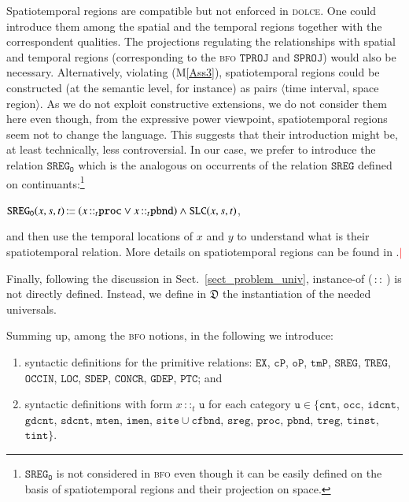 \documentclass[ao]{iosart2x}
\newcommand{\nb}[1]{\textcolor{red}{$|$}\marginpar{\hspace*{-0cm}\parbox{20mm}{\scriptsize\raggedright\textcolor{red}{#1}}}}
\newcommand{\bflist}{\begin{list}{}{\setlength{\topsep}{2mm}\setlength{\parsep}{0mm}\setlength{\leftmargin}{9.2mm}\setlength{\labelwidth}{8mm}}}
\newcommand{\eflist}{\end{list}}
\newcommand{\pr}[1]{\mathtt{#1}}
\newcommand{\cn}[1]{\mathtt{#1}}
\newcommand\textequal{%
 \rule[.08ex]{5pt}{0.35pt}\llap{\rule[.78ex]{5pt}{0.35pt}}}
\newcommand{\sdef}{{\hspace{1.5pt}:\hspace{-2.5pt}\textequal\hspace{3pt}}}
\newcommand{\dolce}{{\textsc{dolce}}}
\newcommand{\bfo}{{\textsc{bfo}}}
\newcommand {\thdolce} {\ensuremath{\mathfrak{D}}}
\newcommand {\SLCd} {\ensuremath{\pr{SLC}}}
\newcommand {\TLCd} {\ensuremath{\pr{TLC}}}
\newcommand{\cntbcat}{\cn{cnt}}
\newcommand{\idcntbcat}{\cn{idcnt}}
\newcommand{\gdcntbcat}{\cn{gdcnt}}
\newcommand{\sdcntbcat}{\cn{sdcnt}}
\newcommand{\mtenbcat}{\cn{mten}}
\newcommand{\imenbcat}{\cn{imen}}
\newcommand{\sitebcat}{\cn{site}}
\newcommand{\cfbndbcat}{\cn{cfbnd}}
\newcommand{\sregbcat}{\cn{sreg}}
\newcommand{\occbcat}{\cn{occ}}
\newcommand{\procbcat}{\cn{proc}}
\newcommand{\pbndbcat}{\cn{pbnd}}
\newcommand{\tregbcat}{\cn{treg}}
\newcommand{\tinstbcat}{\cn{tinst}}
\newcommand{\tintbcat}{\cn{tint}}
\newcommand{\bfocpart}{\pr{cP}}
\newcommand{\bfoopart}{\pr{oP}}
\newcommand{\bfotpart}{\pr{tmP}}
\newcommand{\bfoexist}{\pr{EX}}
\newcommand{\bfoiof}[1]{{\,::_{#1\:\!}}}
\newcommand{\bfosdep}{\pr{SDEP}}
\newcommand{\bfogdep}{\pr{GDEP}}
\newcommand{\bfooccurs}{\pr{OCCIN}}
\newcommand{\bfolocated}{\pr{LOC}}
\newcommand{\bfosregof}{\pr{SREG}}
\newcommand{\bfosregofocc}{\pr{SREG_O}}
\newcommand{\bfotregof}{\pr{TREG}}
\newcommand{\bfoparticin}{\pr{PTC}}
\newcommand{\bfoconcr}{\pr{CONCR}}
\newcommand{\bfotproj}{\pr{TPROJ}}
\newcommand{\bfosproj}{\pr{SPROJ}}
\begin{document}
\medskip
Spatiotemporal regions are compatible but not enforced in {\dolce}. One could introduce them among the spatial and the temporal regions together with the correspondent qualities. The projections regulating the relationships with spatial and temporal regions (corresponding to the {\bfo} $\bfotproj$ and $\bfosproj$) would also be necessary.
Alternatively, violating (M\ref{Ass3}), spatiotemporal regions could be constructed (at the semantic level, for instance) as pairs $\langle$time interval, space region$\rangle$. 
%
As we do not exploit constructive extensions, %
we do not consider them here even though, from the expressive power viewpoint, spatiotemporal regions seem not to change the language. This suggests that their introduction might be, at least technically, less controversial. %
In our case, we prefer to introduce the relation $\bfosregofocc$ which is the analogous on occurrents of the relation $\bfosregof$ defined on continuants:\footnote{$\bfosregofocc$ is not considered in {\bfo} even though it can be easily defined on the basis of spatiotemporal regions and their projection on space.}
%
\bflist
\item[] $\bfosregofocc(x,s,t) \sdef (x \bfoiof{t} \procbcat \lor x \bfoiof{t} \pbndbcat) \land \SLCd(x,s,t)$,
\eflist
%
and then use the temporal locations of $x$ and $y$ to understand what is their spatiotemporal relation. More details on spatiotemporal regions can be found in \cite{OntoCdel2.4}.\nb{CM: rif. deliverable}

Finally, following the discussion in Sect.~\ref{sect_problem_univ}, instance-of ($\bfoiof{}$) is not directly defined. Instead, we define in $\thdolce$ the instantiation of the needed universals.

Summing up, among the {\bfo} notions, in the following we introduce: 
\begin{enumerate}[$(i)$]
\item syntactic definitions for the primitive relations: $\bfoexist$, $\bfocpart$, $\bfoopart$, $\bfotpart$, $\bfosregof$, $\bfotregof$, $\bfooccurs$, $\bfolocated$, $\bfosdep$, $\bfoconcr$, $\bfogdep$, $\bfoparticin$; and 
\item syntactic definitions with form $x \bfoiof{t} \cn{u}$ for each category $\cn{u} \in \{\cntbcat$, $\occbcat$, $\idcntbcat$, $\gdcntbcat$, $\sdcntbcat$, $\mtenbcat$, $\imenbcat$, $\sitebcat{\cup}\cfbndbcat$, $\sregbcat$, $\procbcat$, $\pbndbcat$, $\tregbcat$, $\tinstbcat$, $\tintbcat\}$.
\end{enumerate}
\end{document}
